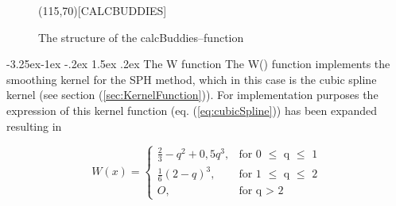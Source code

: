 \documentclass[11pt,a4paper,twoside]{report}
\makeatletter
\renewcommand\paragraph{\@startsection{paragraph}{4}{\z@}%
  {-3.25ex\@plus -1ex \@minus -.2ex}%
  {1.5ex \@plus .2ex}%
  {\normalfont\normalsize\bfseries}}
\makeatother
\begin{document}
\begin{figure}[H]
\label{fig:CalcBuddies_structure}  

\begin{center}
\begin{struktogramm}(115,70)[CALCBUDDIES]
        \change
        \ifend
      \change
      \ifend
    \whileend
  \whileend
\end{struktogramm}
\end{center}

\caption{The structure of the calcBuddies--function}
\end{figure}


\paragraph{The W function}
The W() function implements the smoothing kernel for the SPH method, which in this case is the cubic spline kernel (see section (\ref{sec:KernelFunction})). For implementation purposes the expression of this kernel function (eq. (\ref{eq:cubicSpline})) has been expanded resulting in

\begin{equation}
\label{eq:cubicSplineImplement}
W(x)=\begin{cases}
\frac{2}{3}-q^{2}+0,5q^{3},& \text{for 0 $\leq$ q $\leq$ 1} \\
\frac{1}{6}(2-q)^{3},&  \text{for 1 $\leq$ q $\leq$ 2} \\
O,& \text{for q $>$ 2}
\end{cases}
\end{equation}
\end{document}
